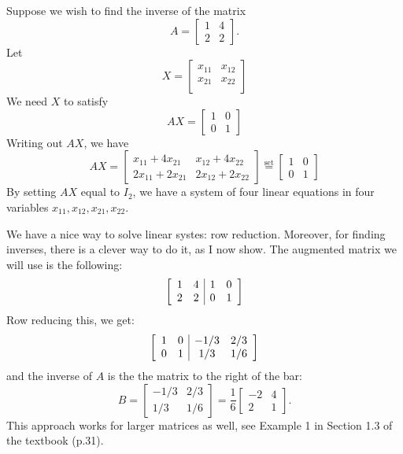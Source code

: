 \documentclass[10pt]{article}
\newenvironment{augmentedmatrix}[1] %
{\left[\begin{array}{#1}}
    {\end{array}\right]}
\theoremstyle{definition}
\begin{document}
Suppose we wish to find the inverse of the matrix
\begin{equation*}
  A =
  \begin{bmatrix}
    1&4\\
    2&2
  \end{bmatrix}.
\end{equation*}
Let
\begin{equation*}
  X =
  \begin{bmatrix}
    x_{11}&x_{12}\\
    x_{21}&x_{22}\\
  \end{bmatrix}
\end{equation*}
We need $X$ to satisfy
\begin{equation*}
  AX =
  \begin{bmatrix}
    1&0\\
    0&1
  \end{bmatrix}
\end{equation*}
Writing out $AX$, we have
\begin{equation*}
  AX =
  \begin{bmatrix}
    x_{11}+4x_{21}& x_{12}+4x_{22}\\
    2x_{11}+2x_{21}& 2x_{12}+2x_{22}
  \end{bmatrix}
  \overset{\text{set}}{=}
  \begin{bmatrix}
    1&0\\
    0&1
  \end{bmatrix}
\end{equation*}
By setting $AX$ equal to $I_{2}$, we have a system of four linear equations in
four variables $x_{11},x_{12},x_{21},x_{22}$.

We have a nice way to solve linear systes: row reduction. Moreover, for
finding inverses, there is a clever way to do it, as I now show. The augmented
matrix we will use is the following:
\begin{equation*}
  \begin{augmentedmatrix}{cc|cc}
    1&4&1&0\\
    2&2&0&1
  \end{augmentedmatrix}
\end{equation*}
Row reducing this, we get:
\begin{equation*}
  \begin{augmentedmatrix}{cc|cc}
    1&0&-1/3&2/3\\
    0&1&1/3&1/6
  \end{augmentedmatrix}
\end{equation*}
and the inverse of $A$ is the the matrix to the right of the bar:
\begin{equation*}
  B =
  \begin{bmatrix}
    -1/3&2/3\\
    1/3&1/6
  \end{bmatrix}
  = \frac{1}{6}
  \begin{bmatrix}
    -2&4\\
    2&1
  \end{bmatrix}.
\end{equation*}
This approach works for larger matrices as well, see Example 1 in Section 1.3
of the textbook (p.31).
\end{document}
